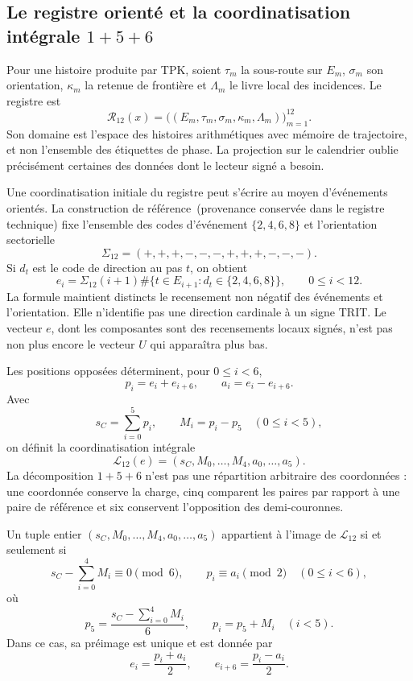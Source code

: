 \subsection{Le registre orienté et la coordinatisation intégrale \texorpdfstring{\(1+5+6\)}{1+5+6}}
\label{subsec:k-registro-integral}

Pour une histoire produite par TPK, soient \(\tau_m\) la sous-route sur
\(E_m\), \(\sigma_m\) son orientation, \(\kappa_m\) la retenue de
frontière et \(\Lambda_m\) le livre local des incidences. Le registre est
\[
 \mathcal R_{12}(x)=
 \bigl((E_m,\tau_m,\sigma_m,\kappa_m,\Lambda_m)\bigr)_{m=1}^{12}.
\]
Son domaine est l'espace des histoires arithmétiques avec mémoire de trajectoire, et non l'ensemble des
étiquettes de phase. La projection sur le calendrier oublie précisément certaines
des données dont le lecteur signé a besoin.

Une coordinatisation initiale du registre peut s'écrire au moyen d'événements orientés. La construction de référence~\textup{(provenance conservée dans le registre technique)} fixe l'ensemble des codes d'événement \(\{2,4,6,8\}\) et l'orientation sectorielle
\[
 \Sigma_{12}=(+,+,+,-,-,-,+,+,+,-,-,-).
\]
Si \(d_t\) est le code de direction au pas \(t\), on obtient
\[
 e_i=\Sigma_{12}(i+1)
 \#\{t\in E_{i+1}:d_t\in\{2,4,6,8\}\},
 \qquad0\leq i<12.
\]
La formule maintient distincts le recensement non négatif des événements et
l'orientation. Elle n'identifie pas une direction cardinale à un signe TRIT. Le
vecteur \(e\), dont les composantes sont des recensements locaux signés, n'est pas non plus
encore le vecteur \(U\) qui apparaîtra plus bas.

Les positions opposées déterminent, pour \(0\leq i<6\),
\[
 p_i=e_i+e_{i+6},\qquad a_i=e_i-e_{i+6}.
\]
Avec
\[
 s_C=\sum_{i=0}^{5}p_i,\qquad M_i=p_i-p_5\quad(0\leq i<5),
\]
on définit la coordinatisation intégrale
\[
 \mathcal L_{12}(e)
 =(s_C,M_0,\ldots,M_4,a_0,\ldots,a_5).
\]
La décomposition \(1+5+6\) n'est pas une répartition arbitraire des coordonnées :
une coordonnée conserve la charge, cinq comparent les paires par rapport à une
paire de référence et six conservent l'opposition des demi-couronnes.

\begin{lemma}
\label{lem:k-carta-integral}
Un tuple entier \((s_C,M_0,\ldots,M_4,a_0,\ldots,a_5)\) appartient à l'image de \(\mathcal L_{12}\) si et seulement si
\[
 s_C-\sum_{i=0}^{4}M_i\equiv0\pmod6,
 \qquad p_i\equiv a_i\pmod2\quad(0\leq i<6),
\]
où
\[
 p_5=\frac{s_C-\sum_{i=0}^{4}M_i}{6},\qquad p_i=p_5+M_i\quad(i<5).
\]
Dans ce cas, sa préimage est unique et est donnée par
\[
 e_i=\frac{p_i+a_i}{2},\qquad e_{i+6}=\frac{p_i-a_i}{2}.
\]
\end{lemma}

